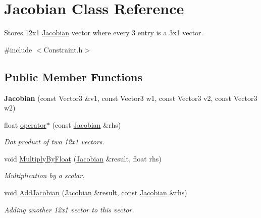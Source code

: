 \hypertarget{classJacobian}{}\section{Jacobian Class Reference}
\label{classJacobian}


Stores 12x1 \hyperlink{classJacobian}{Jacobian} vector where every 3 entry is a 3x1 vector.  




{\ttfamily \#include $<$Constraint.\+h$>$}

\subsection*{Public Member Functions}
\begin{DoxyCompactItemize}
\item 
\mbox{\label{classJacobian_abe4420d2136e50eb25785da05d012c81}} 
{\bfseries Jacobian} (const Vector3 \&v1, const Vector3 w1, const Vector3 v2, const Vector3 w2)
\item 
float \hyperlink{classJacobian_a06719efafa599608998b0262c8cea187}{operator$\ast$} (const \hyperlink{classJacobian}{Jacobian} \&rhs)
\begin{DoxyCompactList}\small\item\em Dot product of two 12x1 vectors. \end{DoxyCompactList}\item 
void \hyperlink{classJacobian_ac71a31b06d325fe4ac5baef25bfad5bc}{Multiply\+By\+Float} (\hyperlink{classJacobian}{Jacobian} \&result, float rhs)
\begin{DoxyCompactList}\small\item\em Multiplication by a scalar. \end{DoxyCompactList}\item 
void \hyperlink{classJacobian_a00f89f0575064ee6312bc18a282cf00d}{Add\+Jacobian} (\hyperlink{classJacobian}{Jacobian} \&result, const \hyperlink{classJacobian}{Jacobian} \&rhs)
\begin{DoxyCompactList}\small\item\em Adding another 12x1 vector to this vector. \end{DoxyCompactList}\end{DoxyCompactItemize}

